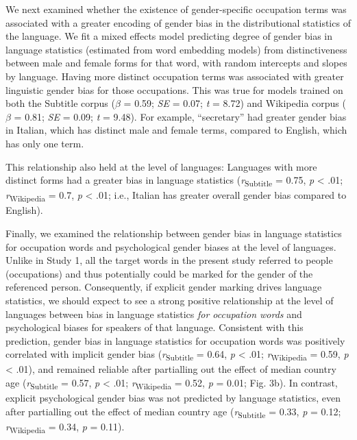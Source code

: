 \documentclass[9pt,twocolumn,twoside,lineno]{pnas-new}
\begin{document}
We next examined whether the existence of gender-specific occupation terms was associated with a greater encoding of gender bias in the distributional statistics of the language. We fit a mixed effects model predicting degree of gender bias in language statistics (estimated from word embedding models) from distinctiveness between male and female forms for that word, with random intercepts and slopes by language. Having more distinct occupation terms was associated with greater linguistic gender bias for those occupations. This was true for models trained on both the Subtitle corpus (\(\beta\) = 0.59; \emph{SE} = 0.07; \emph{t} = 8.72) and Wikipedia
corpus (\(\beta\) = 0.81; \emph{SE} = 0.09; \emph{t} = 9.48). For example, \enquote{secretary} had greater gender bias in Italian, which has distinct male and female terms, compared to English, which has only one term. 

This relationship also held at the level of languages: Languages with more
distinct forms had a greater bias in language statistics
(\emph{r}\textsubscript{Subtitle} = 0.75, \emph{p} \textless{} .01; \emph{r}\textsubscript{Wikipedia} = 0.7, \emph{p} \textless{} .01; i.e., Italian has greater overall gender bias compared to English).

Finally, we examined the relationship between gender bias in language
statistics for occupation words and psychological gender biases at the level of languages.
Unlike in Study 1, all the target words in the present study referred to
people (occupations) and thus potentially could be marked for the gender
of the referenced person. Consequently, if explicit gender marking
drives language statistics, we should expect to see a strong positive
relationship at the level of languages between bias in language
statistics \emph{for occupation words} and psychological biases for
speakers of that language. Consistent with this prediction, gender bias
in language statistics for occupation words was positively correlated
with implicit gender bias (\emph{r}\textsubscript{Subtitle} = 0.64, \emph{p}
\textless{} .01; \emph{r}\textsubscript{Wikipedia}  = 0.59, \emph{p} \textless{} .01),
and remained reliable after partialling out the effect of median country
age (\emph{r}\textsubscript{Subtitle} = 0.57, \emph{p} \textless{} .01; \emph{r}\textsubscript{Wikipedia}  = 0.52, \emph{p} = 0.01; Fig. 3b). In contrast,  explicit psychological gender bias was not predicted by language statistics, even after partialling out the effect of median country age (\emph{r}\textsubscript{Subtitle} = 0.33, \emph{p} = 0.12;
\emph{r}\textsubscript{Wikipedia} = 0.34, \emph{p} = 0.11).
\end{document}
